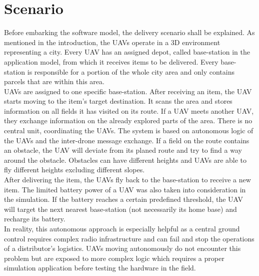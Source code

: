 \section{Scenario}\label{sec:scenario}
Before embarking the software model, the delivery scenario shall be explained. As mentioned in the introduction, the UAVs operate in a 3D environment representing a city. Every UAV has an assigned depot, called base-station in the application model, from which it receives items to be delivered. Every base-station is responsible for a portion of the whole city area and only contains parcels that are within this area. \\
 UAVs are assigned to one specific base-station. After receiving an item, the UAV starts moving to the item’s target destination. It scans the area and stores information on all fields it has visited on its route. If a UAV meets another UAV, they exchange information on the already explored parts of the area. There is no central unit, coordinating the UAVs. The system is based on autonomous logic of the UAVs and the inter-drone message exchange. If a field on the route contains an obstacle, the UAV will deviate from its planed route and try to find a way around the obstacle. Obstacles can have different heights and UAVs are able to fly different heights excluding different slopes. \\
After delivering the item, the UAVs fly back to the base-station to receive a new item. The limited battery power of a UAV was also taken into consideration in the simulation. If the battery reaches a certain predefined threshold, the UAV will target the next nearest base-station (not necessarily its home base) and recharge its battery.\\
In reality, this autonomous approach is especially helpful as a central ground control requires complex radio infrastructure and can fail and stop the operations of a distributor's logistics.  UAVs moving autonomously do not encounter this problem but are exposed to more complex logic which requires a proper simulation application before testing the hardware in the field.


